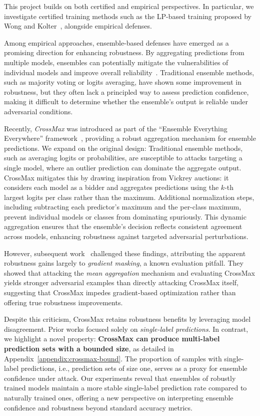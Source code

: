 This project builds on both certified and empirical perspectives. In particular, we investigate certified training methods such as the LP-based training proposed by Wong and Kolter~\cite{wong2018provable}, alongside empirical defenses.

Among empirical approaches, ensemble-based defenses have emerged as a promising direction for enhancing robustness. By aggregating predictions from multiple models, ensembles can potentially mitigate the vulnerabilities of individual models and improve overall reliability~\cite{abbasi2017robustness, pang2019improving}. Traditional ensemble methods, such as majority voting or logits averaging, have shown some improvement in robustness, but they often lack a principled way to assess prediction confidence, making it difficult to determine whether the ensemble’s output is reliable under adversarial conditions.


Recently, \textit{CrossMax} was introduced as part of the ``Ensemble Everything Everywhere'' framework~\cite{fort2024ensemble}, providing a robust aggregation mechanism for ensemble predictions. We expand on the original design: Traditional ensemble methods, such as averaging logits or probabilities, are susceptible to attacks targeting a single model, where an outlier prediction can dominate the aggregate output. CrossMax mitigates this by drawing inspiration from Vickrey auctions: it considers each model as a bidder and aggregates predictions using the $k$-th largest logits per class rather than the maximum. Additional normalization steps, including subtracting each predictor's maximum and the per-class maximum, prevent individual models or classes from dominating spuriously. This dynamic aggregation ensures that the ensemble's decision reflects consistent agreement across models, enhancing robustness against targeted adversarial perturbations.


However, subsequent work~\cite{zhang2024evaluating} challenged these findings, attributing the apparent robustness gains largely to \textit{gradient masking}, a known evaluation pitfall. They showed that attacking the \textit{mean aggregation} mechanism and evaluating CrossMax yields stronger adversarial examples than directly attacking CrossMax itself, suggesting that CrossMax impedes gradient-based optimization rather than offering true robustness improvements.


Despite this criticism, CrossMax retains robustness benefits by leveraging model disagreement. Prior works focused solely on \textit{single-label predictions}. In contrast, we highlight a novel property: \textbf{CrossMax can produce multi-label prediction sets with a bounded size}, as detailed in Appendix~\ref{appendix:crossmax-bound}. The proportion of samples with single-label predictions, i.e., prediction sets of size one, serves as a proxy for ensemble confidence under attack. Our experiments reveal that ensembles of robustly trained models maintain a more stable single-label prediction rate compared to naturally trained ones, offering a new perspective on interpreting ensemble confidence and robustness beyond standard accuracy metrics.



